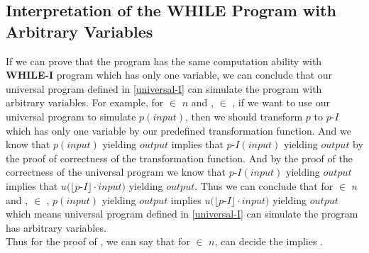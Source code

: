 \subsection{Interpretation of the WHILE Program with Arbitrary Variables}
If we can prove that the \WHILE program has the same computation ability with \textbf{WHILE-I} program which has only one variable,
we can conclude that our universal \WHILE program defined in \ref{universal-I} can simulate the \WHILE program with arbitrary variables.
For example, for  $\in$  $n$ and ,  $\in$ , if we want to use our universal \WHILE program to simulate $p(input)$,
then we should transform $p$ to $p$-$I$ which has only one variable by our predefined transformation function.
And we know that $p(input)$ yielding $output$ implies that $p$-$I(input)$ yielding $output$ by the proof of correctness of the transformation function.
And by the proof of the correctness of the universal \WHILE program we know that $p$-$I(input)$ yielding $output$ implies that $u(\lfloor p$-$I\rfloor \cdot input)$ yielding $output$.
Thus we can conclude that for  $\in$  $n$ and ,  $\in$ , $p(input)$ yielding $output$ implies $u(\lfloor p$-$I\rfloor \cdot input)$ yielding $output$ which means universal \WHILE program defined in \ref{universal-I} can simulate the \WHILE program has arbitrary variables.\\
Thus for the proof of , we can say that for  $\in$  $n$,  can decide the  implies .

